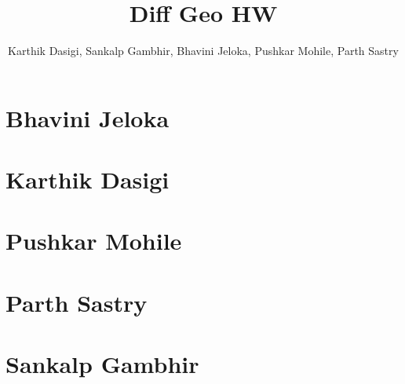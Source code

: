 \documentclass[aspectratio=169]{beamer}
\title{Diff Geo HW}
\author{ %
    Karthik Dasigi,
    Sankalp Gambhir,
    Bhavini Jeloka,
    Pushkar Mohile, 
    Parth Sastry
}
\begin{document}
    \frame{\titlepage}

    \section{Bhavini Jeloka}
    
    

    \section{Karthik Dasigi}
    
    

    \section{Pushkar Mohile}
    

    \section{Parth Sastry}
    
    

    \section{Sankalp Gambhir}
    
    
\end{document}
